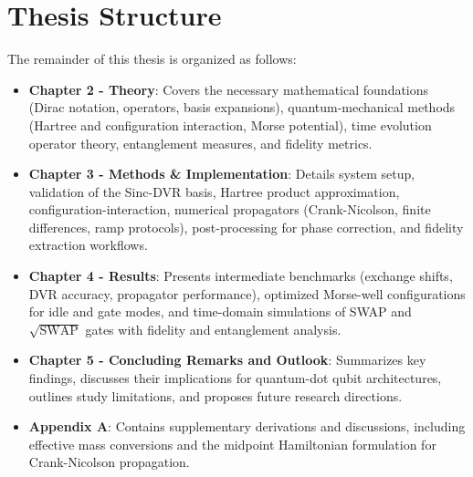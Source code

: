 \documentclass{subfiles}
\begin{document}
\section{Thesis Structure}
The remainder of this thesis is organized as follows:
\begin{itemize}
\item \textbf{Chapter 2 - Theory}: Covers the necessary mathematical foundations (Dirac notation, operators, basis expansions), quantum-mechanical methods (Hartree and configuration interaction, Morse potential), time evolution operator theory, entanglement measures, and fidelity metrics.
\item \textbf{Chapter 3 - Methods & Implementation}: Details system setup, validation of the Sinc-DVR basis, Hartree product approximation, configuration-interaction, numerical propagators (Crank-Nicolson, finite differences, ramp protocols), post-processing for phase correction, and fidelity extraction workflows.
\item \textbf{Chapter 4 - Results}: Presents intermediate benchmarks (exchange shifts, DVR accuracy, propagator performance), optimized Morse-well configurations for idle and gate modes, and time-domain simulations of SWAP and $\sqrt{\text{SWAP}}$ gates with fidelity and entanglement analysis.
\item \textbf{Chapter 5 - Concluding Remarks and Outlook}: Summarizes key findings, discusses their implications for quantum-dot qubit architectures, outlines study limitations, and proposes future research directions.
\item \textbf{Appendix A}: Contains supplementary derivations and discussions, including effective mass conversions and the midpoint Hamiltonian formulation for Crank-Nicolson propagation.
\end{itemize}
\end{document}
